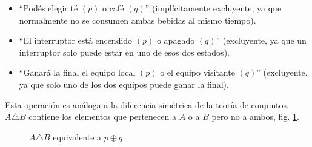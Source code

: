 \begin{fmd-example}
	\begin{itemize}
		\item ``Podés elegir té $(p)$ o café $(q)$'' (implícitamente excluyente, ya que normalmente no se consumen ambas bebidas al mismo tiempo). 
		\item ``El interruptor está encendido $(p)$ o apagado $(q)$'' (excluyente, ya que un interruptor solo puede estar en uno de esos dos estados).
		\item ``Ganará la final el equipo local $(p)$ o el equipo visitante $(q)$'' (excluyente, ya que solo uno de los dos equipos puede ganar la final).
	\end{itemize}
\end{fmd-example}

Esta operación es análoga a la diferencia simétrica de la teoría de conjuntos. $A \triangle B$ contiene los elementos que pertenecen a $A$ o a $B$ pero no a ambos, fig. \ref{fig:disyuncion_excluyente}.

\begin{figure}[h]
	\centering
	\caption{$A \triangle B$ equivalente a $p \oplus q$}
	\label{fig:disyuncion_excluyente}
\end{figure}


